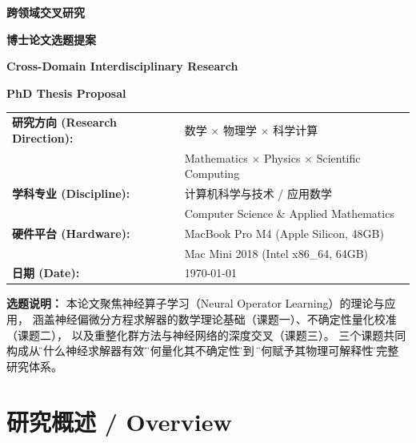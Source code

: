 \documentclass[12pt,a4paper,twoside]{article}
\begin{document}
\begin{titlepage}
    \centering
    \vspace*{2cm}

    {\Huge\bfseries 跨领域交叉研究\par}
    {\Huge\bfseries 博士论文选题提案\par}
    \vspace{1.5cm}

    {\Large\bfseries Cross-Domain Interdisciplinary Research\par}
    {\Large\bfseries PhD Thesis Proposal\par}
    \vspace{2cm}

    \begin{tabular}{ll}
        \textbf{研究方向 (Research Direction):} & 数学 $\times$ 物理学 $\times$ 科学计算 \\
        & Mathematics $\times$ Physics $\times$ Scientific Computing \\
        \hline
        \textbf{学科专业 (Discipline):} & 计算机科学与技术 / 应用数学 \\
        & Computer Science $\&$ Applied Mathematics \\
        \hline
        \textbf{硬件平台 (Hardware):} & MacBook Pro M4 (Apple Silicon, 48GB) \\
        & Mac Mini 2018 (Intel x86\_64, 64GB) \\
        \hline
        \textbf{日期 (Date):} & \today
    \end{tabular}
    \vspace{2cm}

    \parbox{0.9\textwidth}{\small
    \textbf{选题说明：} 本论文聚焦神经算子学习（Neural Operator Learning）的理论与应用，
    涵盖神经偏微分方程求解器的数学理论基础（课题一）、不确定性量化校准（课题二），
    以及重整化群方法与神经网络的深度交叉（课题三）。
    三个课题共同构成从\"为什么神经求解器有效\"到\"如何量化其不确定性\"再到
    \"如何赋予其物理可解释性\"的完整研究体系。}
\end{titlepage}

\clearpage
{}
\tableofcontents
\clearpage
{}

\section*{研究概述 / Overview}
\end{document}
